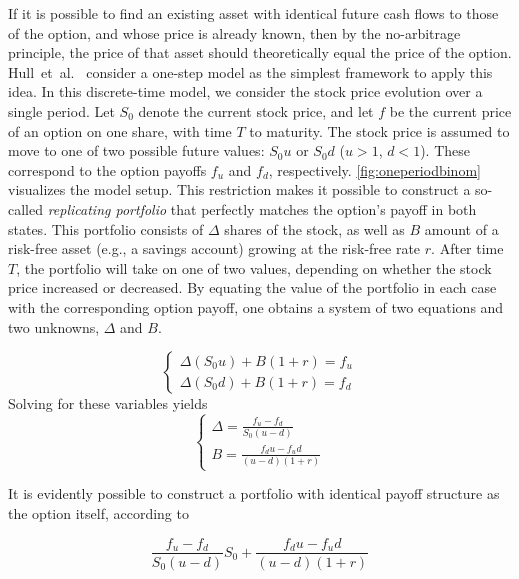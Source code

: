 \documentclass[english,12pt,a4paper,pdftex,sci,utf8]{aaltothesis}
\begin{document}
If it is possible to find an existing asset with identical future cash flows to those of the option, and whose price is already known, then by the no-arbitrage principle, the price of that asset should theoretically equal the price of the option. Hull~et~al.~\cite{hull2013fundamentals} consider a one-step model as the simplest framework to apply this idea. In this discrete-time model, we consider the stock price evolution over a single period. Let $S_0$ denote the current stock price, and let $f$ be the current price of an option on one share, with time $T$ to maturity. The stock price is assumed to move to one of two possible future values: $S_0u$ or $S_0d$ ($u>1$, $d<1$). These correspond to the option payoffs $f_u$ and $f_d$, respectively. \cref{fig:oneperiodbinom} visualizes the model setup. This restriction makes it possible to construct a so-called \emph{replicating portfolio} that perfectly matches the option's payoff in both states. This portfolio consists of $\Delta$ shares of the stock, as well as $B$ amount of a risk-free asset (e.g., a savings account) growing at the risk-free rate $r$. After time $T$, the portfolio will take on one of two values, depending on whether the stock price increased or decreased. By equating the value of the portfolio in each case with the corresponding option payoff, one obtains a system of two equations and two unknowns, $\Delta$ and $B$.

\begin{equation*}
\begin{cases}
    \Delta (S_0u) + B(1+r) = f_u\\
    \Delta (S_0d) + B(1+r) = f_d
\end{cases}
\end{equation*}
Solving for these variables yields
\begin{equation*}
\begin{cases}
    \Delta = \frac{f_u - f_d}{S_0(u-d)}\\
    B = \frac{f_du-f_ud}{(u-d)(1+r)}
\end{cases}
\end{equation*}

It is evidently possible to construct a portfolio with identical payoff structure as the option itself, according to

\begin{equation}
     \frac{f_u - f_d}{S_0(u-d)} S_0 + \frac{f_du-f_ud}{(u-d)(1+r)}
\label{eq:replicating-portfolio}
\end{equation}
\end{document}
